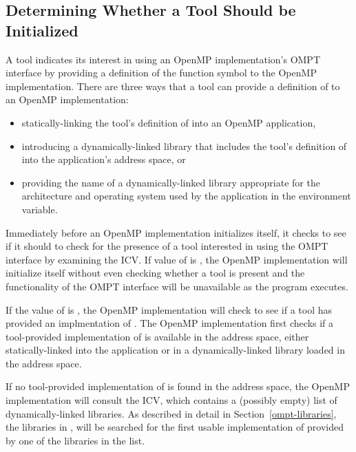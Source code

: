 \subsection{Determining Whether a Tool Should be Initialized}
\label{sec:ompt-check-tool}

A tool indicates its interest in using an OpenMP implementation's OMPT interface 
by providing a definition of the function symbol
 to the OpenMP implementation. There are three ways
that a tool can provide a definition of  to an
OpenMP implementation:

\begin{itemize}
\item statically-linking the tool's definition of 
  into an OpenMP application, 
\item introducing a dynamically-linked library that includes the tool's definition
  of  into the application's address space, or 
\item providing the name of a dynamically-linked library appropriate
  for the architecture and operating system used by the application
  in the  environment variable.
\end{itemize}

Immediately before an OpenMP implementation initializes itself, it
checks to see if it should to check for the presence of a tool
interested in using the OMPT interface by examining the 
ICV.  If value of  is , the OpenMP
implementation will initialize itself without even checking whether a
tool is present and the functionality of the OMPT interface will be
unavailable as the program executes.
 
If the value of  is , the OpenMP
implementation will check to see if a tool has provided an
implmentation of .  The OpenMP implementation first
checks if a tool-provided implementation of  is
available in the address space, either statically-linked into the
application or in a dynamically-linked library loaded in the address
space.

If no tool-provided implementation of  is found in
the address space, the OpenMP implementation will consult the
 ICV, which contains a (possibly empty) list
of dynamically-linked libraries.  As described in detail in
Section~\ref{ompt-libraries}, the libraries in
, will be searched for the first usable
implementation of  provided by one of the libraries
in the list.

